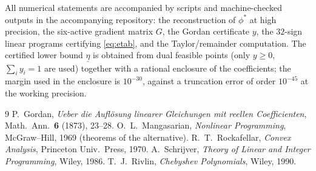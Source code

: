 \documentclass[11pt]{article}
\theoremstyle{definition}
\begin{document}
All numerical statements are accompanied by scripts and machine-checked outputs in the accompanying
repository: the reconstruction of $\phi^\ast$ at high precision, the six-active gradient matrix $G$,
the Gordan certificate $y$, the $32$-sign linear programs certifying \eqref{eq:etab}, and the
Taylor/remainder computation. The certified lower bound $\underline{\eta}$ is obtained from dual
feasible points (only $y\ge0$, $\sum_iy_i=1$ are used) together with a rational enclosure of the
coefficients; the margin used in the enclosure is $10^{-30}$, against a truncation error of order
$10^{-45}$ at the working precision.

\begin{thebibliography}{9}
 P.~Gordan, \emph{Ueber die Aufl\"osung linearer Gleichungen mit reellen
Coefficienten}, Math.\ Ann.\ \textbf{6} (1873), 23--28.
 O.~L.~Mangasarian, \emph{Nonlinear Programming}, McGraw--Hill, 1969
(theorems of the alternative).
 R.~T.~Rockafellar, \emph{Convex Analysis}, Princeton Univ.\ Press, 1970.
 A.~Schrijver, \emph{Theory of Linear and Integer Programming}, Wiley, 1986.
 T.~J.~Rivlin, \emph{Chebyshev Polynomials}, Wiley, 1990.
\end{thebibliography}
\end{document}

